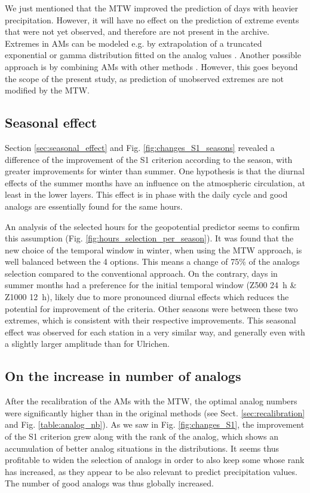 \documentclass[hess, manuscript]{copernicus}
\begin{document}
We just mentioned that the MTW improved the prediction of days with heavier precipitation. However, it will have no effect on the prediction of extreme events that were not yet observed, and therefore are not present in the archive. Extremes in AMs can be modeled e.g. by extrapolation of a truncated exponential or gamma distribution fitted on the analog values \citep{Obled2002}. Another possible approach is by combining AMs with other methods \citep[e.g.][]{Chardon2014}. However, this goes beyond the scope of the present study, as prediction of unobserved extremes are not modified by the MTW.


\subsection{Seasonal effect}

Section \ref{sec:seasonal_effect} and Fig. \ref{fig:changes_S1_seasons} revealed a difference of the improvement of the S1 criterion according to the season, with greater improvements for winter than summer. One hypothesis is that the diurnal effects of the summer months have an influence on the atmospheric circulation, at least in the lower layers. This effect is in phase with the daily cycle and good analogs are essentially found for the same hours.

An analysis of the selected hours for the geopotential predictor seems to confirm this assumption (Fig. \ref{fig:hours_selection_per_season}). It was found that the new choice of the temporal window in winter, when using the MTW approach, is well balanced between the 4 options. This means a change of 75\% of the analogs selection compared to the conventional approach. On the contrary, days in summer months had a preference for the initial temporal window (Z500 24~h \& Z1000 12~h), likely due to more pronounced diurnal effects which reduces the potential for improvement of the criteria. Other seasons were between these two extremes, which is consistent with their respective improvements. This seasonal effect was observed for each station in a very similar way, and generally even with a slightly larger amplitude than for Ulrichen.


\subsection{On the increase in number of analogs}

After the recalibration of the AMs with the MTW, the optimal analog numbers were significantly higher than in the original methods (see Sect. \ref{sec:recalibration} and Fig. \ref{table:analog_nb}). As we saw in Fig. \ref{fig:changes_S1}, the improvement of the S1 criterion grew along with the rank of the analog, which shows an accumulation of better analog situations in the distributions. It seems thus profitable to widen the selection of analogs in order to also keep some whose rank has increased, as they appear to be also relevant to predict precipitation values. The number of good analogs was thus globally increased.
\end{document}
